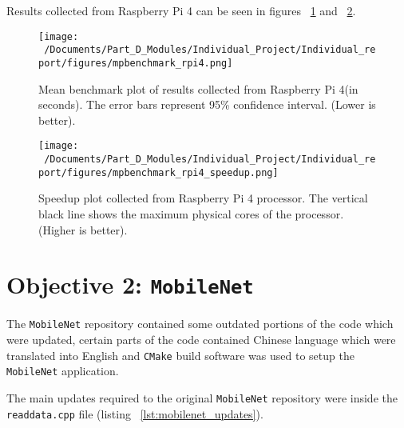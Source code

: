 Results collected from Raspberry Pi 4 can be seen in figures ~\ref{fig:mpbenchmark_rpi4_plot} and ~\ref{fig:mpbenchmark_rpi4_speedup_plot}. 

\begin{figure}[H] %
	\centering
	\texttt{[image: ~/Documents/Part\_D\_Modules/Individual\_Project/Individual\_report/figures/mpbenchmark\_rpi4.png]} %
	\caption{Mean benchmark plot of results collected from Raspberry Pi 4(in seconds). The error bars represent 95\% confidence interval. (Lower is better).}
	\label{fig:mpbenchmark_rpi4_plot} %
\end{figure}

\begin{figure}[H] %
	\centering
	\texttt{[image: ~/Documents/Part\_D\_Modules/Individual\_Project/Individual\_report/figures/mpbenchmark\_rpi4\_speedup.png]} %
	\caption{Speedup plot collected from Raspberry Pi 4 processor. The vertical black line shows the maximum physical cores of the processor. (Higher is better).}
	\label{fig:mpbenchmark_rpi4_speedup_plot} %
\end{figure}

\section{Objective 2: \texttt{MobileNet}}

The \texttt{MobileNet} repository\cite{mobilenet_repo} contained some outdated portions of the code which were updated, certain parts of the code contained Chinese language which were translated into English and \texttt{CMake} build software was used to setup the \texttt{MobileNet} application. 

The main updates required to the original \texttt{MobileNet} repository\cite{mobilenet_repo} were inside the \texttt{readdata.cpp} file (listing ~\ref{lst:mobilenet_updates}). 

